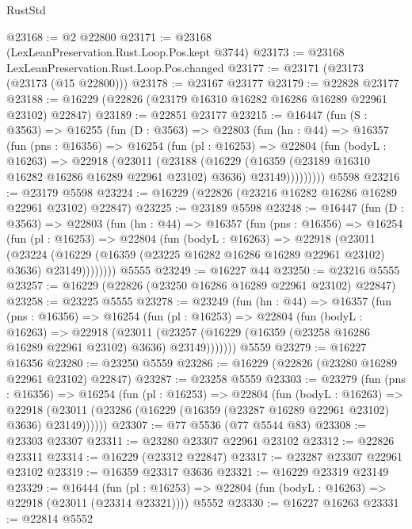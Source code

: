 \begin{lexlean}{RustStd}
\begin{coremodule}
@23168 := @2 @22800
@23171 := @23168 (LexLeanPreservation.Rust.Loop.Pos.kept @3744)
@23173 := @23168 LexLeanPreservation.Rust.Loop.Pos.changed
@23177 := @23171 (@23173 (@23173 (@15 @22800)))
@23178 := @23167 @23177
@23179 := @22828 @23177
@23188 := @16229 (@22826 (@23179 @16310 @16282 @16286 @16289 @22961 @23102) @22847)
@23189 := @22851 @23177
@23215 := @16447
    (fun (S : @3563) =>
    @16255
      (fun (D : @3563) =>
      @22803
        (fun (hn : @44) =>
        @16357
          (fun (pns : @16356) =>
          @16254
            (fun (pl : @16253) =>
            @22804
              (fun (bodyL : @16263) =>
              @22918
                (@23011
                  (@23188
                    (@16229
                      (@16359 (@23189 @16310 @16282 @16286 @16289 @22961 @23102) @3636)
                      @23149)))))))))
    @5598
@23216 := @23179 @5598
@23224 := @16229 (@22826 (@23216 @16282 @16286 @16289 @22961 @23102) @22847)
@23225 := @23189 @5598
@23248 := @16447
    (fun (D : @3563) =>
    @22803
      (fun (hn : @44) =>
      @16357
        (fun (pns : @16356) =>
        @16254
          (fun (pl : @16253) =>
          @22804
            (fun (bodyL : @16263) =>
            @22918
              (@23011
                (@23224
                  (@16229 (@16359 (@23225 @16282 @16286 @16289 @22961 @23102) @3636) @23149))))))))
    @5555
@23249 := @16227 @44
@23250 := @23216 @5555
@23257 := @16229 (@22826 (@23250 @16286 @16289 @22961 @23102) @22847)
@23258 := @23225 @5555
@23278 := @23249
    (fun (hn : @44) =>
    @16357
      (fun (pns : @16356) =>
      @16254
        (fun (pl : @16253) =>
        @22804
          (fun (bodyL : @16263) =>
          @22918
            (@23011
              (@23257 (@16229 (@16359 (@23258 @16286 @16289 @22961 @23102) @3636) @23149)))))))
    @5559
@23279 := @16227 @16356
@23280 := @23250 @5559
@23286 := @16229 (@22826 (@23280 @16289 @22961 @23102) @22847)
@23287 := @23258 @5559
@23303 := @23279
    (fun (pns : @16356) =>
    @16254
      (fun (pl : @16253) =>
      @22804
        (fun (bodyL : @16263) =>
        @22918 (@23011 (@23286 (@16229 (@16359 (@23287 @16289 @22961 @23102) @3636) @23149))))))
@23307 := @77 @5536 (@77 @5544 @83)
@23308 := @23303 @23307
@23311 := @23280 @23307 @22961 @23102
@23312 := @22826 @23311
@23314 := @16229 (@23312 @22847)
@23317 := @23287 @23307 @22961 @23102
@23319 := @16359 @23317 @3636
@23321 := @16229 @23319 @23149
@23329 := @16444
    (fun (pl : @16253) => @22804 (fun (bodyL : @16263) => @22918 (@23011 (@23314 @23321))))
    @5552
@23330 := @16227 @16263
@23331 := @22814 @5552

\end{coremodule}
\end{lexlean}
